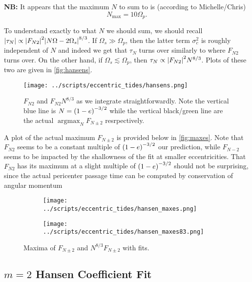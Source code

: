 \documentclass[11pt,
        usenames, %
        dvipsnames %
    ]{article}
\DeclareMathOperator*{\argmax}{argmax}
\DeclarePairedDelimiter\abs{\lvert}{\rvert}
\DeclarePairedDelimiter\p{\lparen}{\rparen}
\begin{document}
\textbf{NB:} It appears that the maximum $N$ to sum to is (according to
Michelle/Chris)
\begin{equation}
    N_{\max} = 10 \Omega_p.
\end{equation}

To understand exactly to what $N$ we should sum, we should recall $\abs*{\tau_N}
\propto \abs*{F_{N2}}^2 \abs*{N\Omega - 2\Omega_s}^{8/3}$. If $\Omega_s \gg
\Omega_p$, then the latter term $\sigma_c^2$ is roughly independent of $N$ and
indeed we get that $\tau_N$ turns over similarly to where $F_{N2}$ turns over.
On the other hand, if $\Omega_s \lesssim \Omega_p$, then $\tau_N \propto
\abs*{F_{N2}}^2 N^{8/3}$. Plots of these two are given in \autoref{fig:hansens}.
\begin{figure}[t]
    \centering
    \texttt{[image: ../scripts/eccentric\_tides/hansens.png]}
    \caption{$F_{N2}$ and $F_{N2} N^{8/3}$ as we integrate straightforwardly.
    Note the vertical blue line is $N = \p*{1 - e}^{-3/2}$ while the vertical
    black/green line are the actual $\argmax_N F_{N\pm 2}$ resrpectively.
    }\label{fig:hansens}
\end{figure}

A plot of the actual maximum $F_{N \pm 2}$ is provided below in
\autoref{fig:maxes}. Note that $F_{N2}$ seems to be a constant multiple of
$\p*{1 - e}^{-3/2}$ our prediction, while $F_{N-2}$ seems to be impacted by the
shallowness of the fit at smaller eccentricities. That $F_{N2}$ has its maximum
at a slight multiple of $\p*{1 - e}^{-3/2}$ should not be surprising, since the
actual pericenter passage time can be computed by conservation of angular
momentum
\begin{figure}[t]
    \centering
    \begin{subfigure}{0.45\textwidth}
        \centering
        \texttt{[image: ../scripts/eccentric\_tides/hansen\_maxes.png]}
    \end{subfigure}
    \begin{subfigure}{0.45\textwidth}
        \centering
        \texttt{[image: ../scripts/eccentric\_tides/hansen\_maxes83.png]}
    \end{subfigure}
    \caption{Maxima of $F_{N\pm 2}$ and $N^{8/3}F_{N\pm 2}$ with
    fits.}\label{fig:maxes}
\end{figure}

\subsection{$m = 2$ Hansen Coefficient Fit}\label{ss:F_n2}
\end{document}
